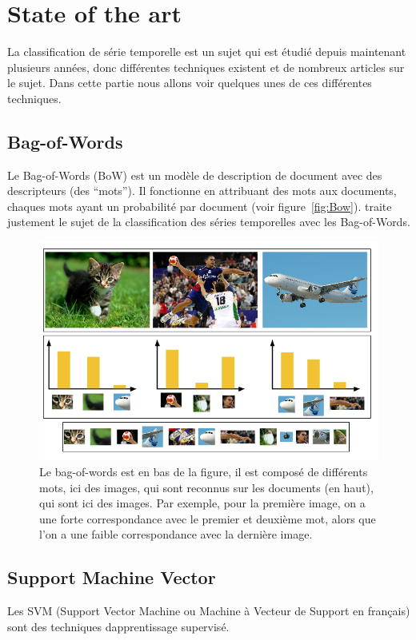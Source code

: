 \documentclass[11pt]{sdm}
\begin{document}
\section{State of the art}
	La classification de s\'erie temporelle est un sujet qui est \'etudi\'e depuis maintenant plusieurs ann\'ees, donc diff\'erentes techniques existent et de nombreux articles sur le sujet. Dans cette partie nous allons voir quelques unes de ces diff\'erentes techniques.
	\subsection{Bag-of-Words}	
		Le Bag-of-Words (BoW) est un mod\`ele de description de document avec des descripteurs (des “mots”). Il fonctionne en attribuant des mots aux documents, chaques mots ayant un probabilit\'e par document (voir figure~\ref{fig:Bow}). \cite{bailly2015bag} traite justement le sujet de la classification des s\'eries temporelles avec les Bag-of-Words.

		\begin{figure}[!ht]
			\centering
			\includegraphics[scale=0.6,natwidth=680,natheight=440]{figure1.png}
			\caption{Le bag-of-words est en bas de la figure, il est compos\'e de diff\'erents mots, ici des images, qui sont reconnus sur les documents (en haut), qui sont ici des images. Par exemple, pour la premi\`ere image, on a une forte correspondance avec le premier et deuxi\`eme mot, alors que l’on a une faible correspondance avec la derni\`ere image.}
			\label{fig:BoW}
		\end{figure}

	\subsection{Support Machine Vector}
		Les SVM (Support Vector Machine ou Machine \`a Vecteur de Support en fran\c cais) sont des techniques d\textquotesingle apprentissage supervis\'e. 
\end{document}
